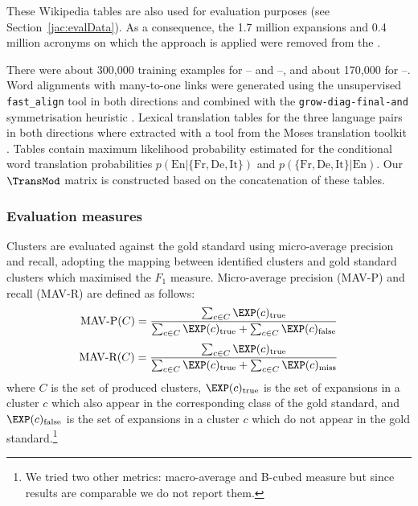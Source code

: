 \documentclass[output=paper]{langsci/langscibook}
\begin{document}
These Wikipedia tables are also used for evaluation purposes (see
Section~\ref{jac:evalData}). As a consequence, the 1.7 million expansions
and 0.4 million acronyms on which the approach is applied were removed
from the .

There were about 300,000 training examples for -- and
--, and about 170,000 for --.  Word
alignments with many-to-one links were generated using the
unsupervised \texttt{fast\_align} tool \citep{dyer-13} in both directions
and combined with the \texttt{grow-diag-final-and} symmetrisation
heuristic \citep{koehn-03}. Lexical translation tables for the three
language pairs in both directions where extracted with a tool from the
Moses translation toolkit \citep{koehn2007moses}. Tables contain maximum
likelihood probability estimated for the conditional word translation
probabilities $p(\text{En}|\{\text{Fr},\text{De},\text{It}\})$ and $p(\{\text{Fr},\text{De},\text{It}\}|\text{En})$. Our
$\TransMod$ matrix is constructed based on the concatenation of these
tables.



\subsubsection{Evaluation measures}

Clusters are evaluated against the gold standard using micro-average
precision and recall, adopting the mapping between identified clusters
and gold standard clusters which maximised the $F_1$
measure. Micro-average precision (MAV-P) and recall (MAV-R) are
defined as follows:
\begin{equation}
\text{MAV-P} (C) = \frac{\sum_{c \in C}{\EXP(c)_{\text{true}}}}{\sum_{c \in C}{\EXP(c)_{\text{true}}}+\sum_{c \in
 C}{\EXP(c)_{\text{false}}}}
\end{equation}
\begin{equation}
\text{MAV-R} (C) = \frac{\sum_{c \in C}{\EXP(c)_{\text{true}}}}{\sum_{c \in C}{\EXP(c)_{\text{true}}}+\sum_{c \in C}{\EXP(c)_{\text{miss}}}}
\end{equation}
where $C$ is the set of produced clusters, $\EXP(c)_{\text{true}}$ is the set
of expansions in a cluster $c$ which also appear in the corresponding
class of the gold standard, and $\EXP(c)_{\text{false}}$ is the set of
expansions in a cluster $c$ which do not appear in the gold
standard.\footnote{We tried two other metrics: macro-average and
  B-cubed measure \citep{bagga-98} but since results are comparable we
  do not report them.}
\end{document}
